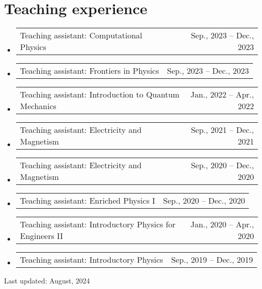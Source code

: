 \documentclass[letterpaper,11pt]{article}
\makeatletter
\newcommand{\TeachingItem}[2]{
	\item{\vspace{-1pt}
		\begin{tabular*}{0.92\textwidth}{l@{\extracolsep{\fill}}r}
			{#1} & {#2}
		\end{tabular*}
		\vspace{-5pt}
	}
}
\makeatother
\begin{document}
\section*{Teaching experience}
\begin{itemize}[leftmargin=*]
	\TeachingItem{Teaching assistant: Computational Physics}{Sep., 2023 -- Dec., 2023}
	\TeachingItem{Teaching assistant: Frontiers in Physics}{Sep., 2023 -- Dec., 2023}
	\TeachingItem{Teaching assistant: Introduction to Quantum Mechanics}{Jan., 2022 -- Apr., 2022}
	\TeachingItem{Teaching assistant: Electricity and Magnetism}{Sep., 2021 -- Dec., 2021}
	\TeachingItem{Teaching assistant: Electricity and Magnetism}{Sep., 2020 -- Dec., 2020}
	\TeachingItem{Teaching assistant: Enriched Physics I}{Sep., 2020 -- Dec., 2020}
	\TeachingItem{Teaching assistant: Introductory Physics for Engineers II}{Jan., 2020 -- Apr., 2020}
	\TeachingItem{Teaching assistant: Introductory Physics}{Sep., 2019 -- Dec., 2019}
\end{itemize}

\vspace{1cm}

\begin{flushright}
	Last updated: August, 2024
\end{flushright}
\end{document}
